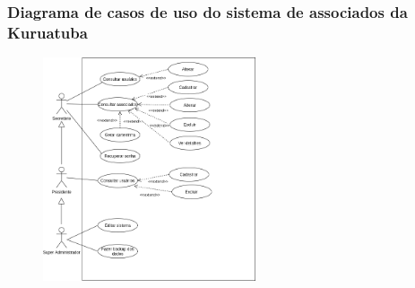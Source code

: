 \documentclass[xcolor=table]{beamer}
\begin{document}
\begin{frame}
    \frametitle{Diagrama de casos de uso do sistema de associados da Kuruatuba}
    \begin{figure}[htb]
        \centering
        \includegraphics[width=0.56\textwidth]{../figuras/use-case-sistema.png}
        
        \label{use-case-sistema}
    \end{figure}
\end{frame}
\end{document}
